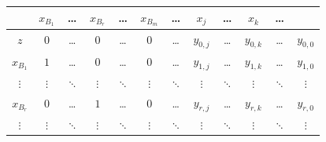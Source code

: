 \documentclass[a4paper]{extarticle}
\renewcommand\arraystretch{}
\begin{document}
\vspace{1em}
\noindent
\begin{table}[H]
    \setlength{\tabcolsep}{8pt}
    \renewcommand{\arraystretch}{1.5}
    \noindent
    \centering
    \begin{tabular}{|c|ccccc|ccccc|c|}
        & \cellcolor{red!25!white}$x_{B_1}$ & \cellcolor{red!25!white}\dots & \cellcolor{red!25!white}$x_{B_r}$ & \cellcolor{red!25!white}\dots & \cellcolor{red!25!white}$x_{B_m}$ & \cellcolor{blue!25!white} \dots & \cellcolor{blue!25!white} $x_j$ & \cellcolor{blue!25!white} \dots &  \cellcolor{blue!25!white} $x_k$ &  \cellcolor{blue!25!white}\dots & \\
        \hline
        $z$ & \cellcolor{green!25!white}$0$ & \cellcolor{green!25!white}\dots & \cellcolor{green!25!white}$0$ & \cellcolor{green!25!white}\dots & \cellcolor{green!25!white}$0$ & \cellcolor{green!25!white}\dots & \cellcolor{green!25!white}$y_{0,j}$ & \cellcolor{green!25!white}\dots & \cellcolor{green!25!white}$y_{0,k}$ & \cellcolor{green!25!white}\dots & \cellcolor{green}$y_{0,0}$\\
        \hline
        \cellcolor{red!25!white}$x_{B_1}$ & \cellcolor{red!50!white}$1$ & \cellcolor{red!50!white}\dots & \cellcolor{red!50!white}$0$ & \cellcolor{red!50!white}\dots & \cellcolor{red!50!white}$0$ & \cellcolor{blue!50!white}\dots & \cellcolor{blue!50!white}$y_{1,j}$ & \cellcolor{blue!50!white}\dots & \cellcolor{blue!50!white}$y_{1,k}$ & \cellcolor{blue!50!white}\dots & \cellcolor{orange!25!white}$y_{1,0}$\\
        \cellcolor{red!25!white}$\vdots$ & \cellcolor{red!50!white}$\vdots$ & \cellcolor{red!50!white}$\ddots$ & \cellcolor{red!50!white}$\vdots$ & \cellcolor{red!50!white}$\ddots$ & \cellcolor{red!50!white}$\vdots$ & \cellcolor{blue!50!white}$\ddots$ & \cellcolor{blue!50!white}$\vdots$ & \cellcolor{blue!50!white}$\ddots$ & \cellcolor{blue!50!white}$\vdots$ & \cellcolor{blue!50!white}$\ddots$ & \cellcolor{orange!25!white}$\vdots$\\
        \cellcolor{red!25!white}$x_{B_r}$ & \cellcolor{red!50!white}$0$ & \cellcolor{red!50!white}\dots & \cellcolor{red!50!white}$1$ & \cellcolor{red!50!white} \dots & \cellcolor{red!50!white}$0$ &\cellcolor{blue!50!white} \dots & \cellcolor{blue!50!white}$y_{r,j}$ & \cellcolor{blue!50!white}\dots & \cellcolor{blue!50!white}$y_{r,k}$ & \cellcolor{blue!50!white}\dots & \cellcolor{orange!25!white}$y_{r,0}$\\
        \cellcolor{red!25!white}$\vdots$ & \cellcolor{red!50!white}$\vdots$ & \cellcolor{red!50!white}$\ddots$ & \cellcolor{red!50!white}$\vdots$ & \cellcolor{red!50!white}$\ddots$ & \cellcolor{red!50!white}$\vdots$ & \cellcolor{blue!50!white}$\ddots$ & \cellcolor{blue!50!white}$\vdots$ & \cellcolor{blue!50!white}$\ddots$ & \cellcolor{blue!50!white}$\vdots$ & \cellcolor{blue!50!white}$\ddots$ & \cellcolor{orange!25!white}$\vdots$\\

\end{tabular}
\end{table}
\end{document}
